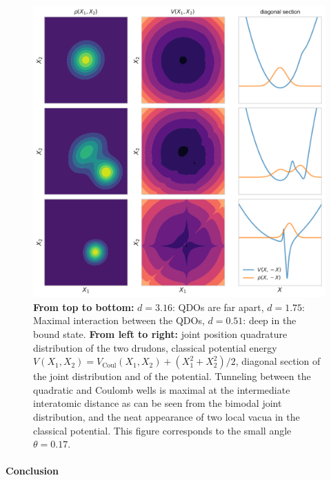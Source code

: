 \documentclass[reprint, amsmath, amssymb, floatfix, aps, pra]{revtex4-2}
\begin{document}
    \begin{figure}
        \includegraphics[scale=0.85]{figures/classical_potential_small_angle.pdf}
        \caption{\label{fig:classical_potential_small_angle}\textbf{From top to bottom:} $d=3.16$: QDOs are far apart, $d=1.75$: Maximal interaction between the QDOs, $d=0.51$: deep in the bound state. \textbf{From left to right:} joint position quadrature distribution of the two drudons, classical potential energy $V(X_1,X_2) = V_\text{Coul}(X_1,X_2) + (X_1^2 + X_2^2) /2$, diagonal section of the joint distribution and of the potential. Tunneling between the quadratic and Coulomb wells is maximal at the intermediate interatomic distance as can be seen from the bimodal joint distribution, and the neat appearance of two local vacua in the classical potential. This figure corresponds to the small angle $\theta=0.17$.}
    \end{figure}


\paragraph*{Conclusion}
\end{document}

